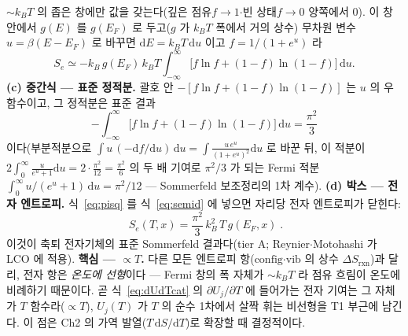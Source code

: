 \documentclass[11pt,a4paper]{article}
\newcommand{\dd}{\mathrm{d}}
\newcommand{\rxn}{\mathrm{rxn}}
\newcommand{\config}{\mathrm{config}}
\newcommand{\vib}{\mathrm{vib}}
\begin{document}
$\sim k_BT$ 의 좁은 창에만 값을 갖는다(깊은 점유$f\!\to\!1$$\cdot$빈 상태$f\!\to\!0$ 양쪽에서 $0$). 이 창 안에서 $g(E)$ 를
$g(E_F)$ 로 두고($g$ 가 $k_BT$ 폭에서 거의 상수) 무차원 변수 $u=\beta(E-E_F)$ 로 바꾸면 $\dd E=k_BT\,\dd u$ 이고
$f=1/(1+e^u)$ 라
\begin{equation}
S_e\simeq -k_B\,g(E_F)\,k_BT\!\int_{-\infty}^{\infty}\!\big[f\ln f+(1-f)\ln(1-f)\big]\,\dd u .
\label{eq:semid}
\end{equation}
\textbf{(c) 중간식 — 표준 정적분.} 괄호 안 $-[f\ln f+(1-f)\ln(1-f)]$ 는 $u$ 의 우함수이고, 그 정적분은 표준 결과
\begin{equation}
-\!\int_{-\infty}^{\infty}\!\big[f\ln f+(1-f)\ln(1-f)\big]\,\dd u=\frac{\pi^2}{3}
\label{eq:pisq}
\end{equation}
이다(부분적분으로 $\int u\,(-\dd f/\dd u)\,\dd u=\int \frac{u\,e^u}{(1+e^u)^2}\dd u$ 로 바꾼 뒤, 이 적분이
$2\!\int_0^\infty\! \frac{u}{e^u+1}\dd u=2\cdot\frac{\pi^2}{12}=\frac{\pi^2}{6}$ 의 두 배 기여로 $\pi^2/3$ 가 되는
Fermi 적분 $\int_0^\infty u/(e^u+1)\,\dd u=\pi^2/12$ — Sommerfeld 보조정리의 1차 계수). \textbf{(d) 박스 — 전자 엔트로피.}
식~\eqref{eq:pisq} 를 식~\eqref{eq:semid} 에 넣으면 자리당 전자 엔트로피가 닫힌다:
\begin{equation}
\boxed{\;S_e(T,x)=\frac{\pi^2}{3}\,k_B^2\,T\,g(E_F,x)\;.}
\label{eq:se}
\end{equation}
이것이 축퇴 전자기체의 표준 Sommerfeld 결과다(tier A; Reynier\cite{reynier2004}$\cdot$Motohashi\cite{motohashi2009} 가 LCO 에
적용). \textbf{핵심 — $\propto T$.}
다른 모든 엔트로피 항($\config$$\cdot$$\vib$ 의 상수 $\Delta S_{\rxn}$)과 달리, 전자 항은 \emph{온도에 선형}이다 — Fermi
창의 폭 자체가 $\sim k_BT$ 라 점유 흐림이 온도에 비례하기 때문이다. 곧 식~\eqref{eq:dUdTcat} 의 $\partial U_j/\partial T$
에 들어가는 전자 기여는 그 자체가 $T$ 함수라($\propto T$), $U_j(T)$ 가 $T$ 의 순수 1차에서 살짝 휘는 비선형을 T1 부근에
남긴다. 이 점은 Ch2 의 가역 발열($T\,\dd S/\dd T$)로 확장할 때 결정적이다.
\end{document}
